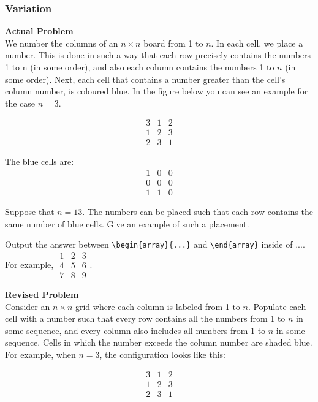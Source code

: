 \subsubsection{Variation}
\textbf{Actual Problem}\\
We number the columns of an $n \times n$ board from 1 to $n$. In each cell, we place a number. This is done in such a way that each row precisely contains the numbers 1 to n (in some order), and also each column contains the numbers 1 to $n$ (in some order). Next, each cell that contains a number greater than the cell’s column number, is coloured blue. In the figure below you can see an example for the case $n = 3$.

$$\begin{array}{ccc}
3 & 1 & 2 \\
1 & 2 & 3 \\
2 & 3 & 1
\end{array}$$

The blue cells are:
$$\begin{array}{ccc}
1 & 0 & 0 \\
0 & 0 & 0 \\
1 & 1 & 0
\end{array}$$

Suppose that $n = 13$. The numbers can be placed such that each row contains the same number of blue cells. Give an example of such a placement.

Output the answer between \verb|\begin{array}{...}| and \verb|\end{array}| inside of $\boxed{...}$. For example, $\boxed{\begin{array}{ccc}1 & 2 & 3 \\ 4 & 5 & 6 \\ 7 & 8 & 9\end{array}}$.

\textbf{Revised Problem}\\
Consider an \( n \times n \) grid where each column is labeled from 1 to \( n \). Populate each cell with a number such that every row contains all the numbers from 1 to \( n \) in some sequence, and every column also includes all numbers from 1 to \( n \) in some sequence. Cells in which the number exceeds the column number are shaded blue. For example, when \( n = 3 \), the configuration looks like this:

$$\begin{array}{ccc}
3 & 1 & 2 \\
1 & 2 & 3 \\
2 & 3 & 1
\end{array}$$

